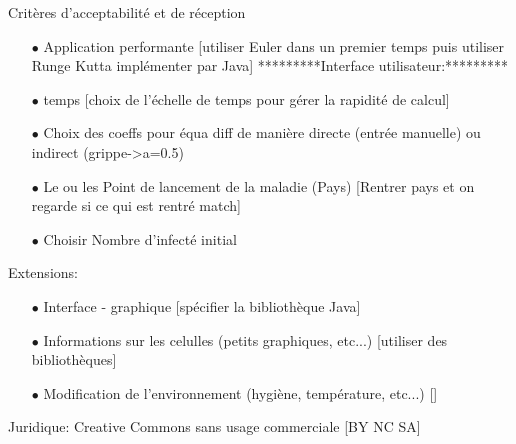 \documentclass[12pt,a4paper]{report}
\begin{document}
\begin{flushleft}
Critères d'acceptabilité et de réception
  \begin{itemize}
	\item[$\bullet$] Application performante [utiliser Euler dans un premier temps puis utiliser Runge Kutta implémenter par Java]
*********Interface utilisateur:*********
	\item[$\bullet$] temps [choix de l'échelle de temps pour gérer la rapidité de calcul]
	\item[$\bullet$] Choix des coeffs pour équa diff de manière directe (entrée manuelle) ou indirect (grippe->a=0.5)
	\item[$\bullet$] Le ou les Point de lancement de la maladie (Pays) [Rentrer pays et on regarde si ce qui est rentré match]
	\item[$\bullet$] Choisir Nombre d'infecté initial
  \end{itemize}
\end{flushleft}

\begin{flushleft}
Extensions:
  \begin{itemize}
	\item[$\bullet$] Interface - graphique [spécifier la bibliothèque Java]
	\item[$\bullet$] Informations sur les celulles (petits graphiques, etc...) [utiliser des bibliothèques]
	\item[$\bullet$] Modification de l'environnement (hygiène, température, etc...) []
  \end{itemize}
\end{flushleft}

\begin{flushleft}
Juridique: Creative Commons sans usage commerciale [BY NC SA]
\end{flushleft}
\end{document}
